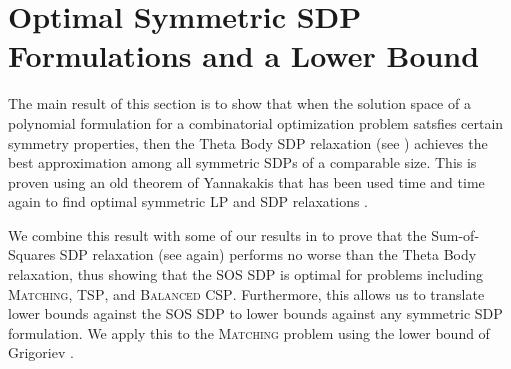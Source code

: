 \chapter{Optimal Symmetric SDP Formulations and a Lower Bound}\cite{cha:symmetric_sdps}
The main result of this section is to show that when the solution space of a polynomial formulation for a combinatorial optimization problem satsfies certain symmetry properties, then the Theta Body SDP relaxation (see ) achieves the best approximation among all symmetric SDPs of a comparable size. This is proven using an old theorem of Yannakakis that has been used time and time again to find optimal symmetric LP and SDP relaxations \cite{TODO}. 

We combine this result with some of our results in  to prove that the Sum-of-Squares SDP relaxation (see  again) performs no worse than the Theta Body relaxation, thus showing that the SOS SDP is optimal for problems including \textsc{Matching}, \textsc{TSP}, and \textsc{Balanced CSP}. Furthermore, this allows us to translate lower bounds against the SOS SDP to lower bounds against any symmetric SDP formulation. We apply this to the \textsc{Matching} problem using the lower bound of Grigoriev \cite{TODO}.

